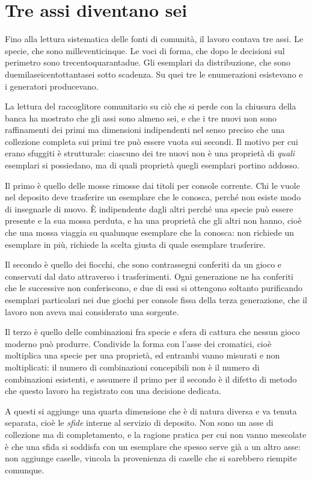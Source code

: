 \section{Tre assi diventano sei}

Fino alla lettura sistematica delle fonti di comunità, il lavoro contava tre assi. Le specie, che sono milleventicinque. Le voci di forma, che dopo le decisioni sul perimetro sono trecentoquarantadue. Gli esemplari da distribuzione, che sono duemilaseicentottantasei sotto scadenza. Su quei tre le enumerazioni esistevano e i generatori producevano.

La lettura del raccoglitore comunitario su ciò che si perde con la chiusura della banca \cite{bank-exclusives} ha mostrato che gli assi sono almeno sei, e che i tre nuovi non sono raffinamenti dei primi ma dimensioni indipendenti nel senso preciso che una collezione completa sui primi tre può essere vuota sui secondi. Il motivo per cui erano sfuggiti è strutturale: ciascuno dei tre nuovi non è una proprietà di \emph{quali} esemplari si possiedano, ma di quali proprietà quegli esemplari portino addosso.

Il primo è quello delle mosse rimosse dai titoli per console corrente. Chi le vuole nel deposito deve trasferire un esemplare che le conosca, perché non esiste modo di insegnarle di nuovo. È indipendente dagli altri perché una specie può essere presente e la sua mossa perduta, e ha una proprietà che gli altri non hanno, cioè che una mossa viaggia su qualunque esemplare che la conosca: non richiede un esemplare in più, richiede la scelta giusta di quale esemplare trasferire.

Il secondo è quello dei fiocchi, che sono contrassegni conferiti da un gioco e conservati dal dato attraverso i trasferimenti. Ogni generazione ne ha conferiti che le successive non conferiscono, e due di essi si ottengono soltanto purificando esemplari particolari nei due giochi per console fissa della terza generazione, che il lavoro non aveva mai considerato una sorgente.

Il terzo è quello delle combinazioni fra specie e sfera di cattura che nessun gioco moderno può produrre. Condivide la forma con l'asse dei cromatici, cioè moltiplica una specie per una proprietà, ed entrambi vanno misurati e non moltiplicati: il numero di combinazioni concepibili non è il numero di combinazioni esistenti, e assumere il primo per il secondo è il difetto di metodo che questo lavoro ha registrato con una decisione dedicata.

A questi si aggiunge una quarta dimensione che è di natura diversa e va tenuta separata, cioè le \emph{sfide} interne al servizio di deposito. Non sono un asse di collezione ma di completamento, e la ragione pratica per cui non vanno mescolate è che una sfida si soddisfa con un esemplare che spesso serve già a un altro asse: non aggiunge caselle, vincola la provenienza di caselle che si sarebbero riempite comunque.

